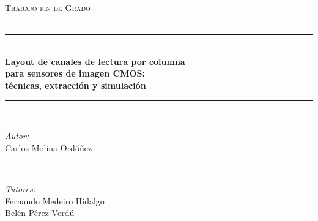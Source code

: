 
\begin{titlepage}

\newcommand{\HRule}{\rule{\linewidth}{0.5mm}} %

\center %


\textsc{\LARGE Trabajo fin de Grado}\\[1.8cm] %


\\[1.4cm]



\HRule \\[0.2cm]
{ \Large \bfseries
Layout de canales de lectura por columna\\[0cm]
para sensores de imagen CMOS:\\[0.3cm]
técnicas, extracción y simulación}\\[0.2cm]
\HRule \\[1.5cm]


\begin{minipage}{0.4\textwidth}
\begin{flushleft} \large
\emph{Autor:}\\
Carlos Molina Ordóñez
\end{flushleft}
\end{minipage}
~
\begin{minipage}{0.4\textwidth}
\begin{flushright} \large
\vspace{9mm}
\emph{Tutores:} \\
Fernando Medeiro Hidalgo \\
Belén Pérez Verdú
\end{flushright}
\end{minipage}\\[2cm]


\end{titlepage}

